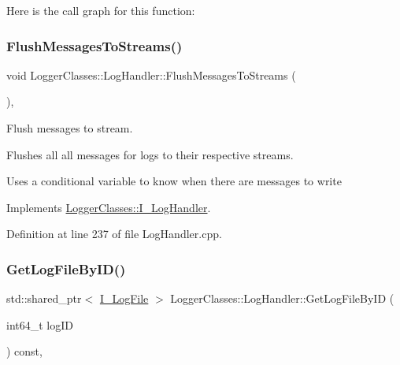 Here is the call graph for this function\+:
\mbox{\label{classLoggerClasses_1_1LogHandler_adf0211bf69aef576ea9585933d24086d}} 
\subsubsection{\texorpdfstring{FlushMessagesToStreams()}{FlushMessagesToStreams()}}
{\footnotesize\ttfamily void Logger\+Classes\+::\+Log\+Handler\+::\+Flush\+Messages\+To\+Streams (\begin{DoxyParamCaption}{ }\end{DoxyParamCaption})\hspace{0.3cm}{\ttfamily [override]}, {\ttfamily [virtual]}}



Flush messages to stream. 

Flushes all all messages for logs to their respective streams.

Uses a conditional variable to know when there are messages to write 

Implements \mbox{\hyperlink{classLoggerClasses_1_1I__LogHandler_a54dad8b6f0fc32bc4bb4ba52f0d378da}{Logger\+Classes\+::\+I\+\_\+\+Log\+Handler}}.



Definition at line 237 of file Log\+Handler.\+cpp.

\mbox{\label{classLoggerClasses_1_1LogHandler_a7f277be7cd639c6b37e2753df1f4925c}} 
\subsubsection{\texorpdfstring{GetLogFileByID()}{GetLogFileByID()}}
{\footnotesize\ttfamily std\+::shared\+\_\+ptr$<$ \mbox{\hyperlink{classLoggerClasses_1_1I__LogFile}{I\+\_\+\+Log\+File}} $>$ Logger\+Classes\+::\+Log\+Handler\+::\+Get\+Log\+File\+By\+ID (\begin{DoxyParamCaption}\item[{int64\+\_\+t}]{log\+ID }\end{DoxyParamCaption}) const\hspace{0.3cm}{\ttfamily [override]}, {\ttfamily [virtual]}}



